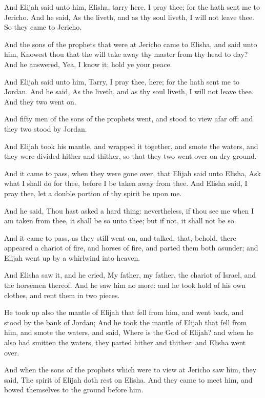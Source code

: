 \verse And Elijah said unto him, Elisha, tarry here, I pray thee; for the \LORD hath sent me to Jericho. And he said, As the \LORD liveth, and as thy soul liveth, I will not leave thee. So they came to Jericho.

\verse And the sons of the prophets that were at Jericho came to Elisha, and said unto him, Knowest thou that the \LORD will take away thy master from thy head to day? And he answered, Yea, I know it; hold ye your peace.

\verse And Elijah said unto him, Tarry, I pray thee, here; for the \LORD hath sent me to Jordan. And he said, As the \LORD liveth, and as thy soul liveth, I will not leave thee. And they two went on.

\verse And fifty men of the sons of the prophets went, and stood to view afar off: and they two stood by Jordan.

\verse And Elijah took his mantle, and wrapped it together, and smote the waters, and they were divided hither and thither, so that they two went over on dry ground.

\verse And it came to pass, when they were gone over, that Elijah said unto Elisha, Ask what I shall do for thee, before I be taken away from thee. And Elisha said, I pray thee, let a double portion of thy spirit be upon me.

\verse And he said, Thou hast asked a hard thing: nevertheless, if thou see me when I am taken from thee, it shall be so unto thee; but if not, it shall not be so.

\verse And it came to pass, as they still went on, and talked, that, behold, there appeared a chariot of fire, and horses of fire, and parted them both asunder; and Elijah went up by a whirlwind into heaven.

\verse And Elisha saw it, and he cried, My father, my father, the chariot of Israel, and the horsemen thereof. And he saw him no more: and he took hold of his own clothes, and rent them in two pieces.

\verse He took up also the mantle of Elijah that fell from him, and went back, and stood by the bank of Jordan; \verse And he took the mantle of Elijah that fell from him, and smote the waters, and said, Where is the \LORD God of Elijah? and when he also had smitten the waters, they parted hither and thither: and Elisha went over.

\verse And when the sons of the prophets which were to view at Jericho saw him, they said, The spirit of Elijah doth rest on Elisha. And they came to meet him, and bowed themselves to the ground before him.

